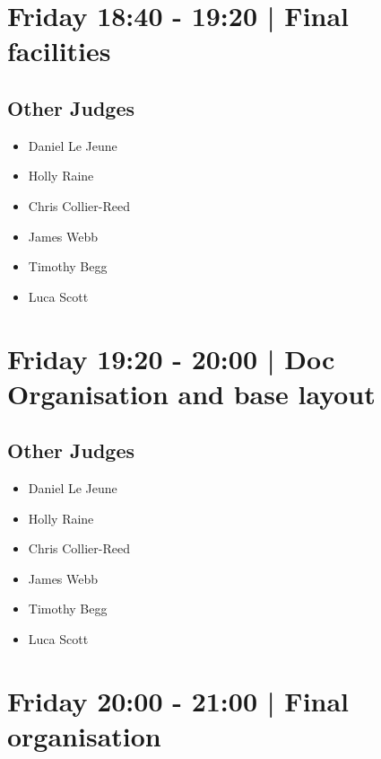 \documentclass[10pt, A5]{article}
\begin{document}
            \section*{Friday 18:40
        -
        19:20
        |
         Final facilities}
        
                
        \subsection*{Other Judges}
        
            \begin{itemize}
                            \item Daniel Le Jeune
                            \item Holly Raine
                            \item Chris Collier-Reed
                            \item James Webb
                            \item Timothy Begg
                            \item Luca Scott
                        \end{itemize}
        

            \section*{Friday 19:20
        -
        20:00
        |
         Doc Organisation and base layout}
        
                
        \subsection*{Other Judges}
        
            \begin{itemize}
                            \item Daniel Le Jeune
                            \item Holly Raine
                            \item Chris Collier-Reed
                            \item James Webb
                            \item Timothy Begg
                            \item Luca Scott
                        \end{itemize}
        

            \section*{Friday 20:00
        -
        21:00
        |
         Final organisation}
        
\end{document}
